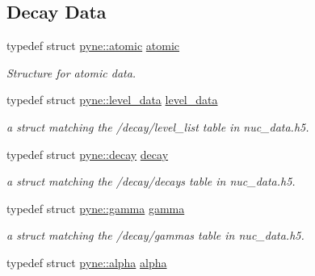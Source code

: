 \subsection*{Decay Data}
\begin{DoxyCompactItemize}
\item 
typedef struct \hyperlink{structpyne_1_1atomic}{pyne\+::atomic} \hyperlink{namespacepyne_abaa14a5fe8b9e50c101b962f74241928}{atomic}\hypertarget{namespacepyne_abaa14a5fe8b9e50c101b962f74241928}{}\label{namespacepyne_abaa14a5fe8b9e50c101b962f74241928}

\begin{DoxyCompactList}\small\item\em Structure for atomic data. \end{DoxyCompactList}\item 
typedef struct \hyperlink{structpyne_1_1level__data}{pyne\+::level\+\_\+data} \hyperlink{namespacepyne_a0b3fcf211f0b5f4673867caf0d1750a8}{level\+\_\+data}\hypertarget{namespacepyne_a0b3fcf211f0b5f4673867caf0d1750a8}{}\label{namespacepyne_a0b3fcf211f0b5f4673867caf0d1750a8}

\begin{DoxyCompactList}\small\item\em a struct matching the \textquotesingle{}/decay/level\+\_\+list\textquotesingle{} table in nuc\+\_\+data.\+h5. \end{DoxyCompactList}\item 
typedef struct \hyperlink{structpyne_1_1decay}{pyne\+::decay} \hyperlink{namespacepyne_ad71ccbdf6a5a6d0a42d06226cffca8ff}{decay}\hypertarget{namespacepyne_ad71ccbdf6a5a6d0a42d06226cffca8ff}{}\label{namespacepyne_ad71ccbdf6a5a6d0a42d06226cffca8ff}

\begin{DoxyCompactList}\small\item\em a struct matching the \textquotesingle{}/decay/decays\textquotesingle{} table in nuc\+\_\+data.\+h5. \end{DoxyCompactList}\item 
typedef struct \hyperlink{structpyne_1_1gamma}{pyne\+::gamma} \hyperlink{namespacepyne_a3deec572922f7eedfa646410158a1345}{gamma}\hypertarget{namespacepyne_a3deec572922f7eedfa646410158a1345}{}\label{namespacepyne_a3deec572922f7eedfa646410158a1345}

\begin{DoxyCompactList}\small\item\em a struct matching the \textquotesingle{}/decay/gammas\textquotesingle{} table in nuc\+\_\+data.\+h5. \end{DoxyCompactList}\item 
typedef struct \hyperlink{structpyne_1_1alpha}{pyne\+::alpha} \hyperlink{namespacepyne_a3fc79ae6aadb879f43b288c4241ab398}{alpha}\hypertarget{namespacepyne_a3fc79ae6aadb879f43b288c4241ab398}{}\label{namespacepyne_a3fc79ae6aadb879f43b288c4241ab398}


\end{DoxyCompactItemize}
